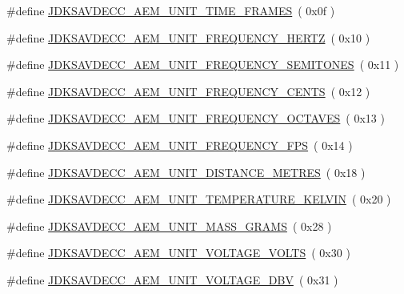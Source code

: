\begin{DoxyCompactItemize}
\item 
\#define \hyperlink{group__units_ga74fa5b6c7182c05a1ccee35658959b35}{J\+D\+K\+S\+A\+V\+D\+E\+C\+C\+\_\+\+A\+E\+M\+\_\+\+U\+N\+I\+T\+\_\+\+T\+I\+M\+E\+\_\+\+F\+R\+A\+M\+ES}~( 0x0f )
\item 
\#define \hyperlink{group__units_ga2178611c873d2055f5d6c437ff4ae37d}{J\+D\+K\+S\+A\+V\+D\+E\+C\+C\+\_\+\+A\+E\+M\+\_\+\+U\+N\+I\+T\+\_\+\+F\+R\+E\+Q\+U\+E\+N\+C\+Y\+\_\+\+H\+E\+R\+TZ}~( 0x10 )
\item 
\#define \hyperlink{group__units_ga921aeeb3769079ccc598a5b6702c6fa5}{J\+D\+K\+S\+A\+V\+D\+E\+C\+C\+\_\+\+A\+E\+M\+\_\+\+U\+N\+I\+T\+\_\+\+F\+R\+E\+Q\+U\+E\+N\+C\+Y\+\_\+\+S\+E\+M\+I\+T\+O\+N\+ES}~( 0x11 )
\item 
\#define \hyperlink{group__units_ga5863668344b0499cc4e77118d580e3c1}{J\+D\+K\+S\+A\+V\+D\+E\+C\+C\+\_\+\+A\+E\+M\+\_\+\+U\+N\+I\+T\+\_\+\+F\+R\+E\+Q\+U\+E\+N\+C\+Y\+\_\+\+C\+E\+N\+TS}~( 0x12 )
\item 
\#define \hyperlink{group__units_ga54988b1f7a354b61a5438885b958e69e}{J\+D\+K\+S\+A\+V\+D\+E\+C\+C\+\_\+\+A\+E\+M\+\_\+\+U\+N\+I\+T\+\_\+\+F\+R\+E\+Q\+U\+E\+N\+C\+Y\+\_\+\+O\+C\+T\+A\+V\+ES}~( 0x13 )
\item 
\#define \hyperlink{group__units_ga8cc9d4a8c696ff9f0640ef7c98b9ade4}{J\+D\+K\+S\+A\+V\+D\+E\+C\+C\+\_\+\+A\+E\+M\+\_\+\+U\+N\+I\+T\+\_\+\+F\+R\+E\+Q\+U\+E\+N\+C\+Y\+\_\+\+F\+PS}~( 0x14 )
\item 
\#define \hyperlink{group__units_ga2ecf5f52055d4d20cb8826f19331362e}{J\+D\+K\+S\+A\+V\+D\+E\+C\+C\+\_\+\+A\+E\+M\+\_\+\+U\+N\+I\+T\+\_\+\+D\+I\+S\+T\+A\+N\+C\+E\+\_\+\+M\+E\+T\+R\+ES}~( 0x18 )
\item 
\#define \hyperlink{group__units_ga9de5ea27c7085ea7eff1a2a1448bc102}{J\+D\+K\+S\+A\+V\+D\+E\+C\+C\+\_\+\+A\+E\+M\+\_\+\+U\+N\+I\+T\+\_\+\+T\+E\+M\+P\+E\+R\+A\+T\+U\+R\+E\+\_\+\+K\+E\+L\+V\+IN}~( 0x20 )
\item 
\#define \hyperlink{group__units_ga8ffda289555c3f6f74f1772bfeb095c1}{J\+D\+K\+S\+A\+V\+D\+E\+C\+C\+\_\+\+A\+E\+M\+\_\+\+U\+N\+I\+T\+\_\+\+M\+A\+S\+S\+\_\+\+G\+R\+A\+MS}~( 0x28 )
\item 
\#define \hyperlink{group__units_ga84f0464934f569d951dd738cff156201}{J\+D\+K\+S\+A\+V\+D\+E\+C\+C\+\_\+\+A\+E\+M\+\_\+\+U\+N\+I\+T\+\_\+\+V\+O\+L\+T\+A\+G\+E\+\_\+\+V\+O\+L\+TS}~( 0x30 )
\item 
\#define \hyperlink{group__units_gaeef7e5d4991eb001da8792bb71b2fd18}{J\+D\+K\+S\+A\+V\+D\+E\+C\+C\+\_\+\+A\+E\+M\+\_\+\+U\+N\+I\+T\+\_\+\+V\+O\+L\+T\+A\+G\+E\+\_\+\+D\+BV}~( 0x31 )

\end{DoxyCompactItemize}
